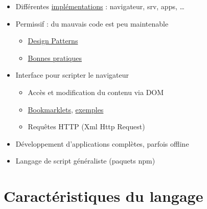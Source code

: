 \begin{itemize}
\tightlist
\item
  Différentes
  \href{https://en.wikipedia.org/wiki/List_of_ECMAScript_engines}{implémentations}
  : navigateur, srv, apps, \ldots{}
\item
  Permissif : du mauvais code est peu maintenable

  \begin{itemize}
  \tightlist
  \item
    \href{https://addyosmani.com/resources/essentialjsdesignpatterns/book/}{Design
    Patterns}
  \item
    \href{http://jstherightway.org/}{Bonnes pratiques}
  \end{itemize}
\item
  Interface pour scripter le navigateur

  \begin{itemize}
  \tightlist
  \item
    Accès et modification du contenu via DOM
  \item
    \href{http://www.howtogeek.com/125846/the-most-useful-bookmarklets-to-enhance-your-browsing-experience/}{Bookmarklets},
    \href{http://www.hongkiat.com/blog/100-useful-bookmarklets-for-better-productivity-ultimate-list/}{exemples}
  \item
    Requêtes HTTP (Xml Http Request)
  \end{itemize}
\item
  Développement d'applications complètes, parfois offline
\item
  Langage de script généraliste (paquets npm)
\end{itemize}

\hypertarget{caractuxe9ristiques-du-langage}{%
\section{Caractéristiques du
langage}\label{caractuxe9ristiques-du-langage}}

